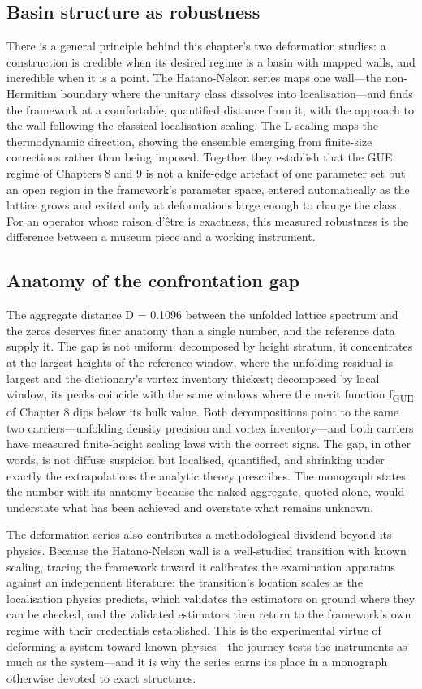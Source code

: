 \documentclass[10pt]{article}
\begin{document}
\subsection{Basin structure as robustness}\label{sec:115}
There is a general principle behind this chapter's two deformation studies: a construction is credible when its desired regime is a basin with mapped walls, and incredible when it is a point. The Hatano-Nelson series maps one wall---the non-Hermitian boundary where the unitary class dissolves into localisation---and finds the framework at a comfortable, quantified distance from it, with the approach to the wall following the classical localisation scaling. The L-scaling maps the thermodynamic direction, showing the ensemble emerging from finite-size corrections rather than being imposed. Together they establish that the GUE regime of Chapters 8 and 9 is not a knife-edge artefact of one parameter set but an open region in the framework's parameter space, entered automatically as the lattice grows and exited only at deformations large enough to change the class. For an operator whose raison d'être is exactness, this measured robustness is the difference between a museum piece and a working instrument.

\subsection{Anatomy of the confrontation gap}\label{sec:116}
The aggregate distance D = 0.1096 between the unfolded lattice spectrum and the zeros deserves finer anatomy than a single number, and the reference data supply it. The gap is not uniform: decomposed by height stratum, it concentrates at the largest heights of the reference window, where the unfolding residual is largest and the dictionary's vortex inventory thickest; decomposed by local window, its peaks coincide with the same windows where the merit function f\textsubscript{GUE} of Chapter 8 dips below its bulk value. Both decompositions point to the same two carriers---unfolding density precision and vortex inventory---and both carriers have measured finite-height scaling laws with the correct signs. The gap, in other words, is not diffuse suspicion but localised, quantified, and shrinking under exactly the extrapolations the analytic theory prescribes. The monograph states the number with its anatomy because the naked aggregate, quoted alone, would understate what has been achieved and overstate what remains unknown.

The deformation series also contributes a methodological dividend beyond its physics. Because the Hatano-Nelson wall is a well-studied transition with known scaling, tracing the framework toward it calibrates the examination apparatus against an independent literature: the transition's location scales as the localisation physics predicts, which validates the estimators on ground where they can be checked, and the validated estimators then return to the framework's own regime with their credentials established. This is the experimental virtue of deforming a system toward known physics---the journey tests the instruments as much as the system---and it is why the series earns its place in a monograph otherwise devoted to exact structures.
\end{document}

